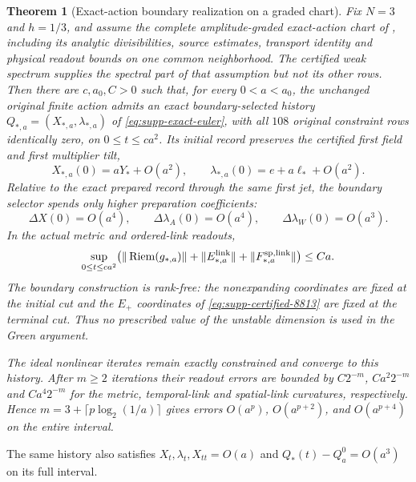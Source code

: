 \documentclass[11pt]{article}
\newtheorem{theorem}{Theorem}[section]
\numberwithin{equation}{section}
\theoremstyle{definition}
\theoremstyle{remark}
\begin{document}
\begin{theorem}[Exact-action boundary realization on a graded chart]
\label{thm:main-exact-boundary}
Fix $N=3$ and $h=1/3$, and assume the complete amplitude-graded
exact-action chart of , including its
analytic divisibilities, source estimates, transport identity and physical
readout bounds on one common neighborhood. The certified weak spectrum
supplies the spectral part of that assumption but not its other rows.
Then there are $c,a_0,C>0$ such that, for every $0<a<a_0$, the unchanged original finite
action admits an exact boundary-selected history
$Q_{*,a}=(X_{*,a},\lambda_{*,a})$ of
\eqref{eq:supp-exact-euler}, with all $108$ original constraint rows
identically zero, on $0\le t\le ca^2$.  Its initial record preserves the
certified first field and first multiplier tilt,
\begin{equation}
 X_{*,a}(0)=aY_*+O(a^2),\qquad
 \lambda_{*,a}(0)=e+a\ell_*+O(a^2).
 \label{eq:main-exact-boundary-first-jet}
\end{equation}
Relative to the exact prepared record through the same first jet, the
boundary selector spends only higher preparation coefficients:
\begin{equation}
 \Delta X(0)=O(a^4),\qquad
 \Delta\lambda_A(0)=O(a^4),\qquad
 \Delta\lambda_W(0)=O(a^3).
 \label{eq:main-exact-boundary-selector-cost}
\end{equation}
In the actual metric and ordered-link readouts,
\begin{equation}
 \sup_{0\le t\le ca^2}
 \bigl(\|\operatorname{Riem}(g_{*,a})\|
   +\|E_{*,a}^{\rm link}\|+\|F_{*,a}^{\rm sp,link}\|\bigr)\le Ca.
 \label{eq:main-exact-boundary-curvature}
\end{equation}
The boundary construction is rank-free: the nonexpanding coordinates are
fixed at the initial cut and the $E_+$ coordinates of
\eqref{eq:supp-certified-8813} are fixed at the terminal cut.  Thus no
prescribed value of the unstable dimension is used in the Green argument.

The ideal nonlinear iterates remain exactly constrained and converge to this
history.  After $m\ge2$ iterations their readout errors are bounded by
$C2^{-m}$, $Ca^2 2^{-m}$ and $Ca^4 2^{-m}$ for the metric, temporal-link
and spatial-link curvatures, respectively.  Hence
$m=3+\lceil p\log_2(1/a)\rceil$ gives errors
$O(a^p)$, $O(a^{p+2})$, and $O(a^{p+4})$ on the entire interval.
\end{theorem}
The same history also satisfies $X_t,\lambda_t,X_{tt}=O(a)$ and
$Q_*(t)-Q_a^0=O(a^3)$ on its full interval.
\end{document}
